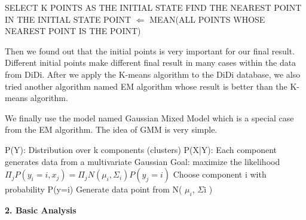 \documentclass{article}
\begin{document}
\begin{algorithm}
    \begin{algorithmic}[1]
    \State SELECT K POINTS AS THE INITIAL STATE
    	\State FIND THE NEAREST POINT IN THE INITIAL STATE
    \EndFor
    	\State POINT $\Leftarrow$ MEAN(ALL POINTS WHOSE NEAREST POINT IS THE POINT)
    \EndFor
    \EndWhile
    \EndProcedure
    \end{algorithmic}
\end{algorithm}

\qquad Then we found out that the initial points is very important for our final result. Different initial points make different final result in many cases within the data from DiDi. After we apply the K-means algorithm to the DiDi database, we also tried another algorithm named EM algorithm whose result is better than the K-means algorithm. \cite{gmm}

\qquad We finally use the model named Gaussian Mixed Model which is a special case from the EM algorithm. The idea of GMM is very simple. 

\begin{algorithm}
    \begin{algorithmic}[1]
    \State P(Y): Distribution over k components (clusters)
    \State P(X|Y): Each component generates data from a multivariate Gaussian
    \State Goal: maximize the likelihood 
    \State $\Pi_jP(y_i=i,x_j)=\Pi_jN(\mu_i,\Sigma_i)P(y_j=i) $
    \State Choose component i with probability P(y=i)
    \State Generate data point from N( $\mu_i$, $\Sigma$i )
    \EndWhile
    \EndProcedure
    \end{algorithmic}
\end{algorithm}

\newpage

\textbf{2. Basic Analysis}
\end{document}
